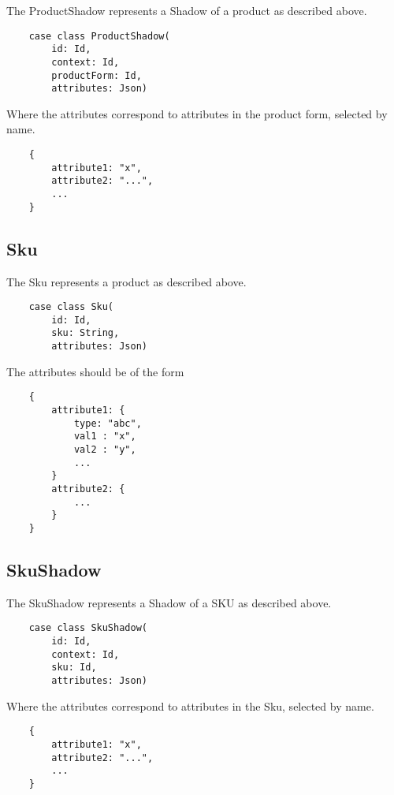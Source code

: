 \documentclass[11pt]{article}
\begin{document}
The ProductShadow represents a Shadow of a product as described above. 

\begin{lstlisting}
    case class ProductShadow(
        id: Id,
        context: Id,
        productForm: Id,
        attributes: Json)
\end{lstlisting}

Where the attributes correspond to attributes in the product form, selected by
name.

\begin{lstlisting}
    {
        attribute1: "x",
        attribute2: "...",
        ...
    }
\end{lstlisting}

\subsection{Sku}

The Sku represents a product as described above. 

\begin{lstlisting}
    case class Sku(
        id: Id,
        sku: String,
        attributes: Json)
\end{lstlisting}

The attributes should be of the form
\begin{lstlisting}
    {
        attribute1: {
            type: "abc",
            val1 : "x",
            val2 : "y",
            ...
        }
        attribute2: {
            ...
        }
    }
\end{lstlisting}


\subsection{SkuShadow}

The SkuShadow represents a Shadow of a SKU as described above. 

\begin{lstlisting}
    case class SkuShadow(
        id: Id,
        context: Id,
        sku: Id,
        attributes: Json)
\end{lstlisting}

Where the attributes correspond to attributes in the Sku, selected by
name.

\begin{lstlisting}
    {
        attribute1: "x",
        attribute2: "...",
        ...
    }
\end{lstlisting}
\end{document}

